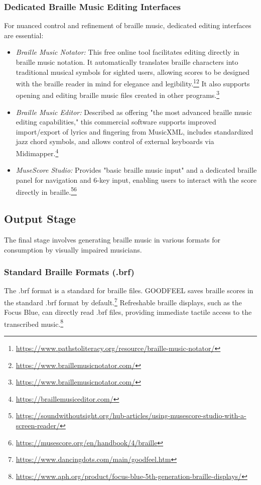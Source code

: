 \subsubsection{Dedicated Braille Music Editing Interfaces}
For nuanced control and refinement of braille music, dedicated editing interfaces are essential:
\begin{itemize}
    \item \emph{Braille Music Notator:} This free online tool facilitates editing directly in braille music notation. It automatically translates braille characters into traditional musical symbols for sighted users, allowing scores to be designed with the braille reader in mind for elegance and legibility.\footnote{\url{https://www.pathstoliteracy.org/resource/braille-music-notator/}}\footnote{\url{https://www.braillemusicnotator.com/}} It also supports opening and editing braille music files created in other programs.\footnote{\url{https://www.braillemusicnotator.com/}}
    \item \emph{Braille Music Editor:} Described as offering "the most advanced braille music editing capabilities," this commercial software supports improved import/export of lyrics and fingering from MusicXML, includes standardized jazz chord symbols, and allows control of external keyboards via Midimapper.\footnote{\url{https://braillemusiceditor.com/}}
    \item \emph{MuseScore Studio:} Provides "basic braille music input" and a dedicated braille panel for navigation and 6-key input, enabling users to interact with the score directly in braille.\footnote{\url{https://soundwithoutsight.org/hub-articles/using-musescore-studio-with-a-screen-reader/}}\footnote{\url{https://musescore.org/en/handbook/4/braille}}
\end{itemize}

\subsection{Output Stage}
The final stage involves generating braille music in various formats for consumption by visually impaired musicians.

\subsubsection{Standard Braille Formats (.brf)}
The .brf format is a standard for braille files. GOODFEEL saves braille scores in the standard .brf format by default.\footnote{\url{https://www.dancingdots.com/main/goodfeel.htm}} Refreshable braille displays, such as the Focus Blue, can directly read .brf files, providing immediate tactile access to the transcribed music.\footnote{\url{https://www.aph.org/product/focus-blue-5th-generation-braille-displays/}}

